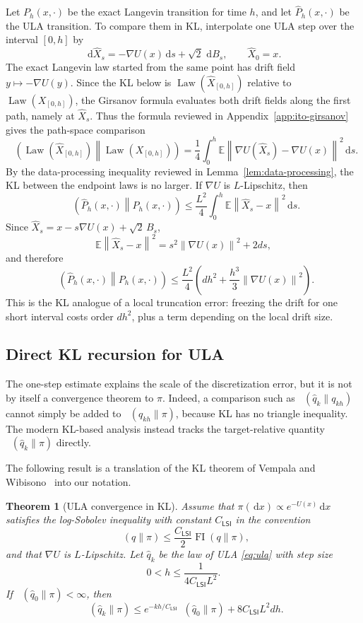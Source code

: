 \documentclass{amsart}
\numberwithin{equation}{section}
\theoremstyle{plain}
\newtheorem{theorem}{Theorem}[section]
\theoremstyle{definition}
\theoremstyle{remark}
\DeclareMathOperator{\KL}{D_{\mathsf{KL}}}
\DeclareMathOperator{\FI}{FI}
\DeclareMathOperator{\Law}{Law}
\newcommand{\E}{\mathbb{E}}
\newcommand{\dd}{\,\mathrm{d}}
\newcommand{\wh}[1]{\widehat{#1}}
\newcommand{\norm}[1]{\left\lVert #1 \right\rVert}
\begin{document}
Let $P_h(x,\cdot)$ be the exact Langevin transition for time $h$, and let
$\wh P_h(x,\cdot)$ be the ULA transition.  To compare them in KL, interpolate
one ULA step over the interval $[0,h]$ by
\[
    \dd \wh X_s=-\nabla U(x)\dd s+\sqrt2\,\dd B_s,\qquad \wh X_0=x.
\]
The exact Langevin law started from the same point has drift field $y\mapsto-\nabla U(y)$.  Since the KL below is $\Law(\wh X_{[0,h]})$ relative to $\Law(X_{[0,h]})$, the Girsanov formula evaluates both drift fields along the first path, namely at $\wh X_s$. Thus the formula reviewed in Appendix~\ref{app:ito-girsanov} gives the path-space comparison
\[
    \KL\!\left(\Law(\wh X_{[0,h]})\middle\|\Law(X_{[0,h]})\right)
    =
    \frac14
    \int_0^h
    \E\norm{\nabla U(\wh X_s)-\nabla U(x)}^2\dd s.
\]
By the data-processing inequality reviewed in Lemma~\ref{lem:data-processing}, the KL between the endpoint laws is no larger.  If $\nabla U$ is $L$-Lipschitz, then
\[
    \KL\!\left(\wh P_h(x,\cdot)\middle\|P_h(x,\cdot)\right)
    \leq
    \frac{L^2}{4}
    \int_0^h \E\norm{\wh X_s-x}^2\dd s.
\]
Since $\wh X_s=x-s\nabla U(x)+\sqrt2\,B_s$,
\[
    \E\norm{\wh X_s-x}^2=s^2\norm{\nabla U(x)}^2+2ds,
\]
and therefore
\begin{equation}\label{eq:ula-local-kl}
    \KL\!\left(\wh P_h(x,\cdot)\middle\|P_h(x,\cdot)\right)
    \leq
    \frac{L^2}{4}
    \left(dh^2+\frac{h^3}{3}\norm{\nabla U(x)}^2\right).
\end{equation}
This is the KL analogue of a local truncation error: freezing the drift for one short interval costs order $dh^2$, plus a term depending on the local drift size.

\subsection{Direct KL recursion for ULA}

The one-step estimate explains the scale of the discretization error, but it is not by itself a convergence theorem to $\pi$.  Indeed, a comparison such as $\KL(\wh q_k\|q_{kh})$ cannot simply be added to $\KL(q_{kh}\|\pi)$, because KL has no triangle inequality.  The modern KL-based analysis instead tracks the target-relative quantity $\KL(\wh q_k\|\pi)$ directly.

The following result is a translation of the KL theorem of Vempala and Wibisono~\cite{vempala2019rapidula} into our notation.

\begin{theorem}[ULA convergence in KL]\label{thm:ula-kl-vw}
Assume that $\pi(\dd x)\propto e^{-U(x)}\dd x$ satisfies the log-Sobolev
inequality with constant $C_{\mathsf{LSI}}$ in the convention
\[
    \KL(q\|\pi)\leq \frac{C_{\mathsf{LSI}}}{2}\FI(q\|\pi),
\]
and that $\nabla U$ is $L$-Lipschitz.  Let $\wh q_k$ be the law of ULA
\eqref{eq:ula} with step size
\[
    0<h\leq \frac{1}{4C_{\mathsf{LSI}}L^2}.
\]
If $\KL(\wh q_0\|\pi)<\infty$, then
\begin{equation}\label{eq:ula-vw-kl}
    \KL(\wh q_k\|\pi)
    \leq
    e^{-kh/C_{\mathsf{LSI}}}\KL(\wh q_0\|\pi)
    +8C_{\mathsf{LSI}}L^2dh.
\end{equation}
\end{theorem}
\end{document}
